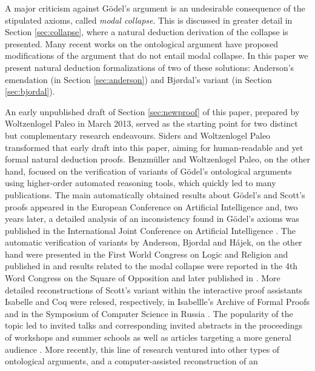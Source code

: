 \documentclass[smallextended]{svjour3}
\begin{document}
A major criticism against G\"odel's argument is an undesirable consequence of the stipulated axioms, called \emph{modal collapse}. This is discussed in greater detail in Section \ref{sec:collapse}, where a natural deduction derivation of the collapse is presented. Many recent works on the ontological argument have proposed modifications of the argument that do not entail modal collapse. In this paper we present natural deduction formalizations of two of these solutions: Anderson's emendation (in Section \ref{sec:anderson}) and Bj{\o}rdal's variant (in Section \ref{sec:bjordal}).

An early unpublished draft of Section \ref{sec:newproof} of this paper,
prepared by Woltzenlogel Paleo in March 2013, served as the starting
point for two distinct but complementary research endeavours. Siders
and Woltzenlogel Paleo transformed that early draft into this paper,
aiming for human-readable and yet formal natural deduction proofs.
Benzm\"uller and Woltzenlogel Paleo, on the other hand, focused on the
verification of variants of G\"odel's ontological arguments using
higher-order automated reasoning tools, which quickly led to many
publications. The main automatically obtained results about G\"odel's
and Scott's proofs appeared in the European Conference on Artificial
Intelligence \citep{ECAI2014} and, two years later, a detailed
analysis of an inconsistency found in G\"odel's axioms was published
in the International Joint Conference on Artificial Intelligence
\citep{IJCAI2016}. The automatic verification of variants by Anderson,
Bjordal and H\'ajek, on the other hand were presented in the First
World Congress on Logic and Religion
\citep{WorldCongressLogicAndReligion} and published in
\citep{controversy} and results related to the modal
collapse were reported in the 4th Word Congress on the Square of
Opposition \citep{SquareOfOpposition} and later published in
\citep{ModalCollapse}. More detailed reconstructions of Scott's
variant within the interactive proof assistants Isabelle and Coq were
relesed, respectively, in Isabellle's Archive of Formal Proofs
\citep{IsabelleGod} and in the Symposium of Computer Science in Russia
\citep{CSRModalLogicInCoq}. The popularity of the topic led to invited
talks and corresponding invited abstracts in the proceedings of
workshops \citep{WADT,WADTPreProceedings,IWIL} and summer schools
\citep{SpiritualQuest,ReasoningWebSummerSchool} as well as articles
targeting a more general audience \citep{AustrianComputerSociety}.
More recently, this line of research ventured into other types of
ontological arguments, and a computer-assisted reconstruction of an
\end{document}
